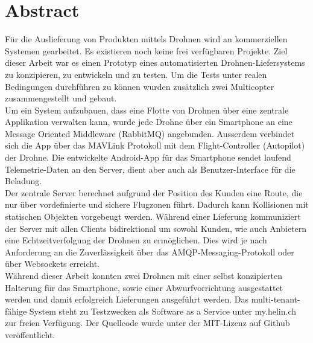 \newpage
{}
\chapter*{Abstract}

Für die Auslieferung von Produkten mittels Drohnen wird an kommerziellen Systemen gearbeitet. 
Es existieren noch keine frei verfügbaren Projekte. 
Ziel dieser Arbeit war es einen Prototyp eines automatisierten Drohnen-Liefersystems zu konzipieren, zu entwickeln und zu testen. 
Um die Tests unter realen Bedingungen durchführen zu können wurden zusätzlich zwei Multicopter zusammengestellt und gebaut.\\

Um ein System aufzubauen, dass eine Flotte von Drohnen über eine zentrale Applikation verwalten kann, wurde jede Drohne über ein Smartphone an eine Message Oriented Middleware (RabbitMQ) angebunden. 
Ausserdem verbindet sich die App über das \Gls{MAVLink} Protokoll mit dem \Gls{Flight-Controller} (Autopilot) der Drohne. 
Die entwickelte Android-App für das Smartphone sendet laufend Telemetrie-Daten an den Server, dient aber auch als Benutzer-Interface für die Beladung. \\

Der zentrale Server berechnet aufgrund der Position des Kunden eine Route, die nur über vordefinierte und sichere Flugzonen führt. 
Dadurch kann Kollisionen mit statischen Objekten vorgebeugt werden. 
Während einer Lieferung kommuniziert der Server mit allen Clients bidirektional um sowohl Kunden, wie auch Anbietern eine Echtzeitverfolgung der Drohnen zu ermöglichen. Dies wird je nach Anforderung an die Zuverlässigkeit über das AMQP-Messaging-Protokoll oder über Websockets erreicht.  \\

Während dieser Arbeit konnten zwei Drohnen mit einer selbst konzipierten Halterung für das Smartphone, sowie einer Abwurfvorrichtung ausgestattet werden und damit erfolgreich Lieferungen ausgeführt werden. Das multi-tenant-fähige System steht zu Testzwecken als Software as a Service unter my.helin.ch zur freien Verfügung. Der Quellcode wurde unter der MIT-Lizenz auf Github veröffentlicht.

